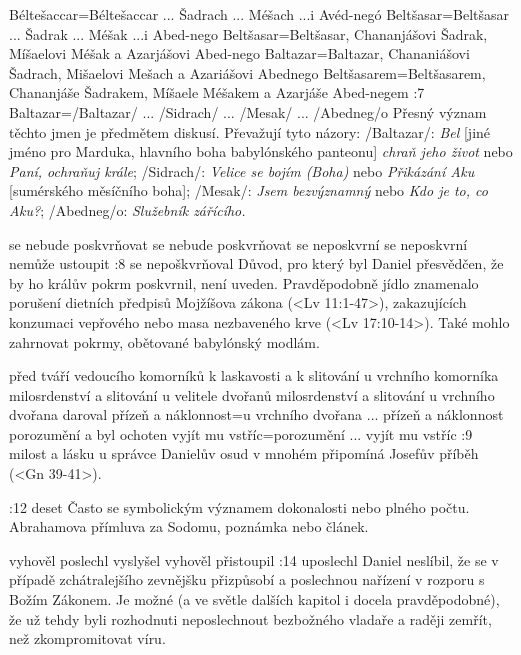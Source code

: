     {Béltešaccar}={Béltešaccar ... Šadrach ... Méšach ...i Avéd-negó} %
    {Beltšasar}={Beltšasar ... Šadrak ... Méšak ...i Abed-nego}  %
    {Beltšasar}={Beltšasar, Chananjášovi Šadrak, Míšaelovi Méšak a Azarjášovi Abed-nego} %
    {Baltazar}={Baltazar, Chananiášovi Šadrach, Mišaelovi Mešach a Azariášovi Abednego}  %
    {Beltšasarem}={Beltšasarem, Chananjáše Šadrakem, Míšaele Méšakem a Azarjáše Abed-negem}  %
:7  {Baltazar}={\x/Baltazar/ ... \x/Sidrach/ ... \x/Mesak/ ...  \x/Abedneg/o}
     Přesný význam těchto jmen je předmětem diskusí. Převažují tyto názory: 
     \x/Baltazar/: {\em Bel} [jiné jméno pro Marduka, hlavního boha babylónského panteonu]
     {\em chraň jeho život} nebo {\em Paní, ochraňuj krále}; 
     \x/Sidrach/: {\em Velice se bojím (Boha)} nebo {\em Přikázání Aku} [sumérského měsíčního boha];
     \x/Mesak/:   {\em Jsem bezvýznamný} nebo {\em Kdo je to, co Aku?};
     \x/Abedneg/o: {\em Služebník zářícího.}
     
    {se nebude poskvrňovat} %
    {se nebude poskvrňovat}  %
    {se neposkvrní} %
    {se neposkvrní}  %
    {nemůže ustoupit}  %
:8 {se nepoškvrňoval} Důvod, pro který byl Daniel přesvědčen, že by ho králův pokrm poskvrnil, není uveden. Pravděpodobně jídlo znamenalo porušení dietních předpisů Mojžíšova zákona  (<Lv 11:1-47>), zakazujících konzumaci vepřového nebo masa nezbaveného krve (<Lv 17:10-14>). Také mohlo zahrnovat pokrmy, obětované babylónský modlám. 

    {před tváří vedoucího komorníků k laskavosti a k slitování} %
    {u vrchního komorníka milosrdenství a slitování}  %
    {u velitele dvořanů milosrdenství a slitování} %
    {u vrchního dvořana daroval přízeň a náklonnost}={u vrchního dvořana ... přízeň a náklonnost}  %
    {porozumění a byl ochoten vyjít mu vstříc}={porozumění ... vyjít mu vstříc}  %
:9 {milost a lásku u správce} Danielův osud v mnohém připomíná Josefův příběh (<Gn 39-41>).

:12 {deset} Často se symbolickým významem dokonalosti nebo plného počtu. \dopsat  Abrahamova přímluva za Sodomu, poznámka nebo článek.

    {vyhověl} %
    {poslechl}  %
    {vyslyšel} %
    {vyhověl}  %
    {přistoupil}  %
:14 {uposlechl} Daniel neslíbil, že se v případě zchátralejšího zevnějšku přizpůsobí a poslechnou nařízení v rozporu s Božím Zákonem. Je možné (a ve světle dalších kapitol i docela pravděpodobné), že už tehdy byli rozhodnuti neposlechnout bezbožného vladaře a raději zemřít, než zkompromitovat víru.

